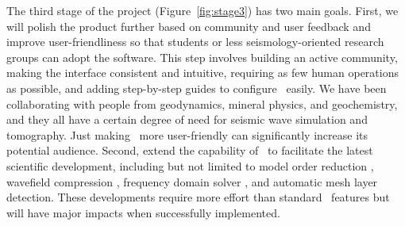 \documentclass[11pt,letter]{article}
\begin{document}
The third stage of the project (Figure~\ref{fig:stage3}) has two main goals.
First, we will polish the product further based on community and user feedback and improve user-friendliness so that students or less seismology-oriented research groups can adopt the software. This step involves building an active community, making the interface consistent and intuitive, requiring as few human operations as possible, and adding step-by-step guides to configure \SF\ easily. We have been collaborating with people from geodynamics, mineral physics, and geochemistry, and they all have a certain degree of need for seismic wave simulation and tomography. Just making \SF\ more user-friendly can significantly increase its potential audience. 
Second, extend the capability of \SF\ to facilitate the latest scientific development, including but not limited to model order reduction \citep{Hawkins2023}, wavefield compression \citep{Boehm2016}, frequency domain solver \citep{Gharti2023}, and automatic mesh layer detection. These developments require more effort than standard \SF\ features but will have major impacts when successfully implemented.




\newpage



\end{document}
